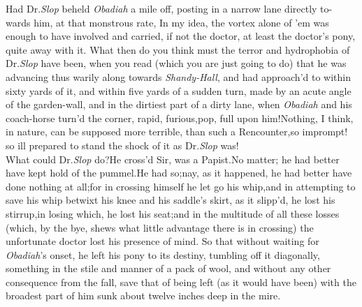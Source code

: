 \documentclass{article}
\begin{document}
Had Dr.\@ \textit{Slop} beheld \textit{Obadiah} a mile\break
off, posting in a narrow lane directly to-\break
wards him, at that monstrous rate,\tsh\break
{}
\tsh In my idea, the vortex alone of\break
’em was enough to have involved and carried, if not the doctor, at least the
doctor’s pony, quite away with it. What then do you think
must the terror and hydrophobia of Dr.\@ \textit{Slop} have been, when
you read (which you are just going to do) that he was advancing
thus warily along towards \textit{Shandy-Hall}, and had
approach’d to
within sixty yards of it, and within five yards of a sudden turn,
made by an acute angle of the garden-wall,\break
\tsk and in the dirtiest part of a dirty lane,\break
\tsk when \textit{Obadiah} and his coach-horse 
turn’d the corner, rapid, furious,\tsk pop,\break
\tsk full upon him!\tsk Nothing, I think, in
nature, can be supposed more terrible,
than such a Rencounter,\tsk so imprompt! 
so ill prepared to stand the shock
of it as Dr.\@ \textit{Slop} was!\\
\newpage
What could Dr.\@ \textit{Slop} do?\tsh He cross’d
Sir, was a Papist.\tsk No matter; he had better have kept
hold of the pummel.\break He had so;\tsk nay, as it
happened, he had better have done nothing at all;\tsk for in
crossing himself he let go his whip,\tsk\break and in
attempting to save his whip betwixt his knee and his
saddle’s skirt, as it slipp’d, he lost his stirrup,\tsk in
losing which, he lost his seat;\tsk and in the multitude of
all these losses (which, by the bye, shews what little
advantage there is in crossing) the unfortunate doctor lost
his presence of mind. So that without waiting for
\textit{Obadiah}’s onset, he left his pony to its destiny,
tumbling off it diagonally, something in the stile and
manner of a pack of wool, and without any other consequence
from the fall, save that of being left (as it would have
been)
with the broadest part of him sunk about twelve inches deep in the mire.
\end{document}
